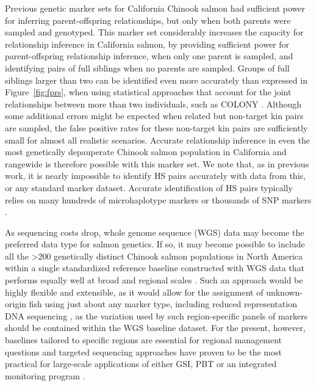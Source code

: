 Previous genetic marker sets for California Chinook salmon had sufficient power for inferring
parent-offspring relationships, but only when both parents were sampled and genotyped.
This marker set considerably increases the capacity for relationship inference in California
salmon, by providing sufficient power for parent-offspring relationship inference, when only
one parent is sampled, and identifying pairs of full siblings when no parents are sampled.
Groups of full siblings larger than two can be identified even more accurately than expressed in Figure~\ref{fig:fprs},
when using statistical approaches that account for the joint relationships between more than two individuals,
such as COLONY \citep{wang2004sibship}.
Although some additional errors might be
expected when related but non-target kin pairs are sampled,  the false positive rates
for these non-target kin pairs are sufficiently small
for almost all realistic scenarios.
Accurate relationship
inference in even the most genetically depauperate Chinook salmon population in California
and rangewide \citep{seeb2007development,clemento2014evaluation} is therefore possible with this marker set.
We note that, as in previous work, it is nearly impossible to identify HS pairs accurately
with data from this, or any standard marker dataset. Accurate identification of HS pairs
typically relies on many hundreds of microhaplotype markers \citep{baetscher2018microhaplotypes} or thousands of SNP markers \citep{hillary2018genetic}. 

As sequencing costs drop, whole genome sequence (WGS) data may become the preferred
data type for salmon genetics. If so, it may become possible to include
all the >200 genetically distinct Chinook salmon populations in North America within a
single standardized reference baseline constructed with WGS data
that performs equally well at broad and regional scales \citep{desaixINPRESSpopulation}.
Such an approach would be highly flexible and extensible, as it would allow for the 
assignment of unknown-origin fish using
just about any marker type, including reduced representation DNA sequencing
\citep[e.g.,~RADseq,][]{meek2020identifying,thompson2024genomics},
as the variation used by such region-specific panels of markers should be contained within the WGS baseline dataset.
For the present, however,
baselines tailored to specific regions are essential for regional management questions and
targeted sequencing approaches have proven to be the most practical for large-scale
applications of either GSI, PBT or an integrated monitoring program \citep{beacham2021parentage}.



